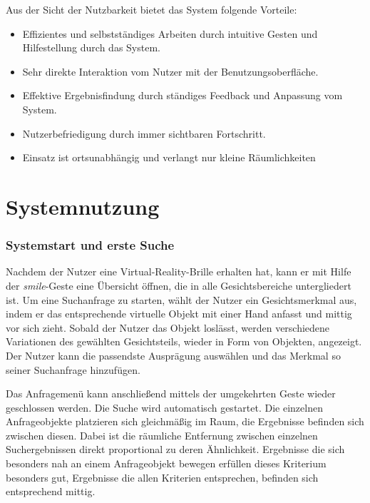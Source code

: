 \documentclass{sigchi-ext}
\begin{document}
Aus der Sicht der Nutzbarkeit bietet das System folgende Vorteile:
\begin{itemize}\compresslist%
\item Effizientes und selbstständiges Arbeiten durch intuitive Gesten und Hilfestellung durch das System.
\item Sehr direkte Interaktion vom Nutzer mit der Benutzungsoberfläche.
\item Effektive Ergebnisfindung durch ständiges Feedback und Anpassung vom System.
\item Nutzerbefriedigung durch immer sichtbaren Fortschritt.
\item Einsatz ist ortsunabhängig und verlangt nur kleine Räumlichkeiten
\end{itemize}

\section{Systemnutzung}
\subsubsection{Systemstart und erste Suche}
Nachdem der Nutzer eine Virtual-Reality-Brille erhalten hat, kann er mit Hilfe der \textit{smile}-Geste eine Übersicht öffnen, die in alle Gesichtsbereiche untergliedert ist. Um eine Suchanfrage zu starten, wählt der Nutzer ein Gesichtsmerkmal aus, indem er das entsprechende virtuelle Objekt mit einer Hand anfasst und mittig vor sich zieht. Sobald der Nutzer das Objekt loslässt, werden verschiedene Variationen des gewählten Gesichtsteils, wieder in Form von Objekten, angezeigt. Der Nutzer kann die passendste Ausprägung auswählen und das Merkmal so seiner Suchanfrage hinzufügen.

Das Anfragemenü kann anschließend mittels der umgekehrten Geste wieder geschlossen werden. Die Suche wird automatisch gestartet. Die einzelnen Anfrageobjekte platzieren sich gleichmäßig im Raum, die Ergebnisse befinden sich zwischen diesen. Dabei ist die räumliche Entfernung zwischen einzelnen Suchergebnissen direkt proportional zu deren Ähnlichkeit. Ergebnisse die sich besonders nah an einem Anfrageobjekt bewegen erfüllen dieses Kriterium besonders gut, Ergebnisse die allen Kriterien entsprechen, befinden sich entsprechend mittig.
\end{document}
